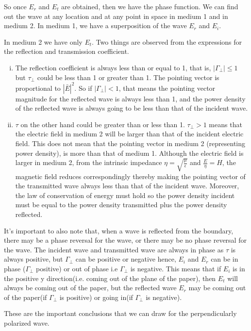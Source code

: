So once $E_{r}$ and $E_{t}$ are obtained, then we have the phase function. We can find out the wave at any location and at any point in space in medium 1 and in medium 2. In medium  1, we have a superposition of the wave $E_{r}$ and $E_{i}$.

In medium 2 we have only $E_{t}$. Two things are observed from the expressions for the reflection and transmission coefficient.
\begin{enumerate}[(i)]
\item The reflection coefficient is always less than or equal to 1, that is, $|\Gamma_{\bot}| \leq 1$ but $\tau_{\bot}$ could be less than 1 or greater than 1. The pointing vector is proportional  to $|\bar{E}|^{2}$. So if $|\Gamma_{\bot}|< 1$, that means the pointing vector magnitude for the reflected wave is always less than 1, and the power density of the reflected wave is always going to be less than that of the incident wave.
\item $\tau$ on the other hand could be greater than or less than 1.  $\tau_{\bot} > 1$ means that the electric field in medium 2 will be larger than that of the incident electric field. This does not mean that the pointing vector in medium 2 (representing power density), is more than that of medium 1. Although the electric field is larger in medium 2, from the intrinsic impedance $\eta=\sqrt{\frac{\mu}{\epsilon}}$ and $\frac{E}{\eta} =H$, the magnetic field reduces correspondingly thereby making the pointing vector of the transmitted wave always less than that of the incident wave. Moreover, the law of conservation of energy must hold so the power density incident must be equal to the power density transmitted plus the power density reflected.
\end{enumerate}
It's important to also note that, when a wave is reflected from the boundary, there may be a phase reversal for the wave, or there may be no phase reversal for the wave. The incident wave and transmitted wave are always in phase as $\tau$ is always positive, but $\Gamma_{\perp}$ can be positive or negative hence, $E_{i}$ and $E_{r}$ can be in phase ($\Gamma_{\perp}$ positive) or out of phase i.e $\Gamma_{\perp}$ is negative. This means that if $E_{i}$ is in the positive y direction(i.e. coming out of the plane of the paper), then $E_{t}$ will always be coming out of the paper, but the reflected wave $E_{r}$ may be coming out of the paper(if $\Gamma_{\perp}$ is positive) or going in(if $\Gamma_{\perp}$ is negative).

These are the important conclusions that we can draw for the perpendicularly polarized wave.

